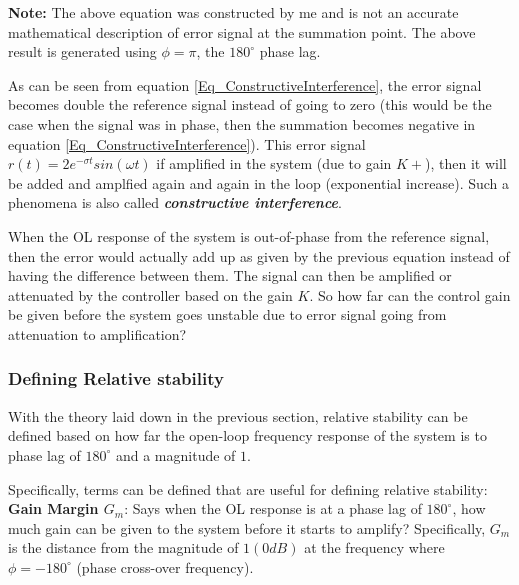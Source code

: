 \textbf{Note: }The above equation was constructed by me and is not an accurate mathematical description of error signal at the summation point. The above result is generated using $\phi = \pi$, the $180^{\circ}$ phase lag.

As can be seen from equation \eqref{Eq_ConstructiveInterference}, the error signal becomes double the reference signal instead of going to zero (this would be the case when the signal was in phase, then the summation becomes negative in equation \eqref{Eq_ConstructiveInterference}). This error signal $r(t) = 2 e^{-\sigma t} sin(\omega t)$ if amplified in the system (due to gain $K + $), then it will be added and amplfied again and again in the loop (exponential increase). Such a phenomena is also called \textbf{\textit{constructive interference}}.

When the OL response of the system is out-of-phase from the reference signal, then the error would actually add up as given by the previous equation instead of having the difference between them. The signal can then be amplified or attenuated by the controller based on the gain $K$. So how far can the control gain be given before the system goes unstable due to error signal going from attenuation to amplification?

\subsubsection{Defining Relative stability}

With the theory laid down in the previous section, relative stability can be defined based on how far the open-loop frequency response of the system is to phase lag of $180^{\circ}$ and a magnitude of $1$.

Specifically, terms can be defined that are useful for defining relative stability:
\textbf{Gain Margin $G_m$}: Says when the OL response is at a phase lag of $180^{\circ}$, how much gain can be given to the system before it starts to amplify?
Specifically, $G_m$ is the distance from the magnitude of $1 (0 dB)$ at the frequency where $\phi = -180^{\circ}$ (phase cross-over frequency).

